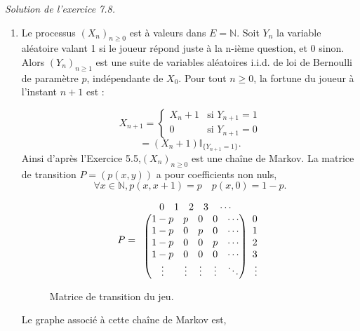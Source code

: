 \noindent \textit{Solution de l’exercice 7.8.}
\begin{enumerate} 
    \item Le processus $(X_n)_{n \geq 0}$ est à valeurs dans $E = \mathbb{N}$. Soit $Y_n$ la variable aléatoire valant 1 si le joueur répond juste à la n-ième question, et 0 sinon. Alors $(Y_n)_{n\geq 1}$ est une suite de variables aléatoires i.i.d. de loi de Bernoulli de paramètre $p$, indépendante de $X_0$. Pour tout $n \geq 0$, la fortune du joueur à l’instant $n + 1$ est :

\[
X_{n+1} = 
\begin{cases}
X_n + 1 & \text{si } Y_{n+1} = 1 \\
0 & \text{si } Y_{n+1} = 0
\end{cases}
\]
\[
= (X_n + 1) \mathbb{I}_{\{Y_{n+1}=1\}}.
\]
Ainsi d’après l’Exercice 5.5,$ (X_n)_{n \geq 0}$ est une chaîne de Markov.
La matrice de transition $P = (p(x, y))$ a pour coefficients non nuls,
\[
\forall x \in \mathbb{N}, p(x, x+1) = p \quad p(x, 0) = 1 - p.
\]
\newpage
\begin{figure}[h]
\[
P =
\begin{array}{c@{}c@{}c} 
\begin{array}{r}
0 \quad 1 \quad 2 \quad 3 \quad \cdots
\end{array}
\\
\begin{pmatrix}
    1 - p & p & 0 & 0 & \cdots \\
    1 - p & 0 & p & 0 & \cdots \\
    1 - p & 0 & 0 & p & \cdots \\
    1 - p & 0 & 0 & 0 & \cdots \\
    \vdots & \vdots & \vdots & \vdots & \ddots
\end{pmatrix}
&
\begin{array}{r}
0 \\ 1 \\ 2 \\ 3 \\ \vdots
\end{array}

\end{array}
\]
\centering
\caption{Matrice de transition du jeu.}
\end{figure}


\noindent Le graphe associé à cette chaîne de Markov est,
\begin{figure}[h!]
    \centering
\end{figure}
\end{enumerate}
